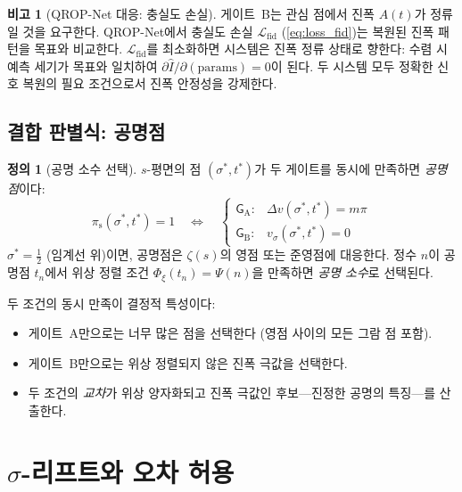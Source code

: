 \documentclass[11pt, a4paper]{article}
\theoremstyle{definition}
\newtheorem{definition}{정의}[section]
\newtheorem{remark}{비고}[section]
\theoremstyle{plain}
\newcommand{\Phiz}{\Phi_\xi}
\newcommand{\Ampl}{A}
\newcommand{\Psip}{\Psi}
\newcommand{\pis}{\pi_{\mathrm{s}}}
\newcommand{\GateA}{\mathsf{G}_{\mathrm{A}}}
\newcommand{\GateB}{\mathsf{G}_{\mathrm{B}}}
\begin{document}
\begin{remark}[QROP-Net 대응: 충실도 손실]
\label{rem:gate_b_parallel}
게이트~B는 관심 점에서 진폭 $\Ampl(t)$가 정류일 것을 요구한다. QROP-Net에서 충실도 손실 $\mathcal{L}_{\mathrm{fid}}$ (\cref{eq:loss_fid})는 복원된 진폭 패턴을 목표와 비교한다. $\mathcal{L}_{\mathrm{fid}}$를 최소화하면 시스템은 진폭 정류 상태로 향한다: 수렴 시 예측 세기가 목표와 일치하여 $\partial \hat{I}/\partial(\text{params}) = 0$이 된다. 두 시스템 모두 정확한 신호 복원의 필요 조건으로서 진폭 안정성을 강제한다.
\end{remark}


\subsection{결합 판별식: 공명점}

\begin{definition}[공명 소수 선택]
\label{def:resonant_prime}
$s$-평면의 점 $(\sigma^*, t^*)$가 두 게이트를 동시에 만족하면 \textit{공명점}이다:
\begin{equation}
\boxed{
  \pis(\sigma^*, t^*) = 1 \quad\iff\quad
  \begin{cases}
    \GateA: & \Delta v(\sigma^*, t^*) = m\pi \\
    \GateB: & v_\sigma(\sigma^*, t^*) = 0
  \end{cases}
}
\label{eq:discriminant}
\end{equation}
$\sigma^* = \tfrac{1}{2}$ (임계선 위)이면, 공명점은 $\zeta(s)$의 영점 또는 준영점에 대응한다. 정수 $n$이 공명점 $t_n$에서 위상 정렬 조건 $\Phiz(t_n) = \Psip(n)$을 만족하면 \textit{공명 소수}로 선택된다.
\end{definition}

두 조건의 동시 만족이 결정적 특성이다:
\begin{itemize}
  \item 게이트~A만으로는 너무 많은 점을 선택한다 (영점 사이의 모든 그람 점 포함).
  \item 게이트~B만으로는 위상 정렬되지 않은 진폭 극값을 선택한다.
  \item 두 조건의 \textit{교차}가 위상 양자화되고 진폭 극값인 후보---진정한 공명의 특징---를 산출한다.
\end{itemize}


\section{$\sigma$-리프트와 오차 허용}
\label{sec:sigma_lift}
\end{document}
